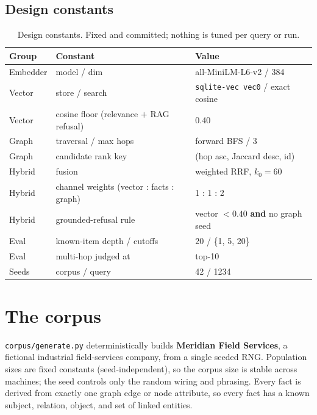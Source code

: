 \documentclass[11pt]{article}
\begin{document}
\subsection{Design constants}
\begin{table}[h]\centering\small
\begin{tabular}{lll}
\toprule
Group & Constant & Value \\
\midrule
Embedder & model / dim & all-MiniLM-L6-v2 / 384 \\
Vector & store / search & \texttt{sqlite-vec vec0} / exact cosine \\
Vector & cosine floor (relevance $+$ RAG refusal) & 0.40 \\
Graph & traversal / max hops & forward BFS / 3 \\
Graph & candidate rank key & (hop asc, Jaccard desc, id) \\
Hybrid & fusion & weighted RRF, $k_0=60$ \\
Hybrid & channel weights (vector : facts : graph) & 1 : 1 : 2 \\
Hybrid & grounded-refusal rule & vector $<0.40$ \textbf{and} no graph seed \\
Eval & known-item depth / cutoffs & 20 / \{1, 5, 20\} \\
Eval & multi-hop judged at & top-10 \\
Seeds & corpus / query & 42 / 1234 \\
\bottomrule
\end{tabular}
\caption{Design constants. Fixed and committed; nothing is tuned per query or run.}
\end{table}

\section{The corpus}
\texttt{corpus/generate.py} deterministically builds \textbf{Meridian Field Services}, a
fictional industrial field-services company, from a single seeded RNG. Population sizes are
fixed constants (seed-independent), so the corpus size is stable across machines; the seed
controls only the random wiring and phrasing. Every fact is derived from exactly one graph
edge or node attribute, so every fact has a known subject, relation, object, and set of
linked entities.
\end{document}
